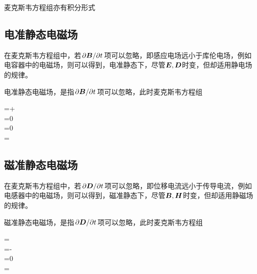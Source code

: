 \begin{BoxEquation}[麦克斯韦方程组的积分形式]
    麦克斯韦方程组亦有积分形式
\end{BoxEquation}

\subsection{电准静态电磁场}
在麦克斯韦方程组中，若$\pdv*{\vb*{B}}{t}$项可以忽略，即感应电场远小于库伦电场，例如电容器中的电磁场，则可以得到，电准静态下，尽管$\vb*{E},\vb*{D}$时变，但却适用静电场的规律。
\begin{BoxEquation}[电准静态电磁场]
    电准静态电磁场，是指$\pdv*{\vb*{B}}{t}$项可以忽略，此时麦克斯韦方程组
    \begin{Gather}[10pt]
        \curl{}=+\\
        \curl{}=0\\
        \div{}=0\\
        \div{}=\rho
    \end{Gather}
\end{BoxEquation}

\subsection{磁准静态电磁场}
在麦克斯韦方程组中，若$\pdv*{\vb*{D}}{t}$项可以忽略，即位移电流远小于传导电流，例如电感器中的电磁场，则可以得到，磁准静态下，尽管$\vb*{B},\vb*{H}$时变，但却适用静磁场的规律。
\begin{BoxEquation}[磁准静态电磁场]
    磁准静态电磁场，是指$\pdv*{\vb*{D}}{t}$项可以忽略，此时麦克斯韦方程组
    \begin{Gather}[10pt]
        \curl{}=\\
        \curl{}=-\\
        \div{}=0\\
        \div{}=\rho
    \end{Gather}
\end{BoxEquation}